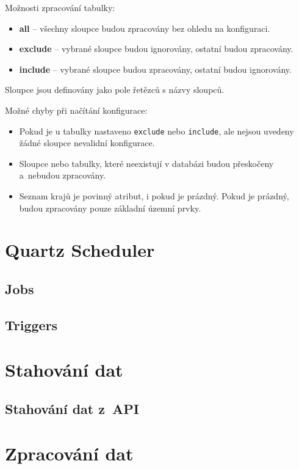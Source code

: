 \begin{enumerate}
    Možnosti zpracování tabulky:
    \begin{itemize}
        \item \textbf{all} -- všechny sloupce budou zpracovány bez ohledu na konfiguraci.
        \item \textbf{exclude} -- vybrané sloupce budou ignorovány, ostatní budou zpracovány.
        \item \textbf{include} -- vybrané sloupce budou zpracovány, ostatní budou ignorovány.
    \end{itemize}

    Sloupce jsou definovány jako pole řetězců s názvy sloupců.
\end{enumerate}

Možné chyby při načítání konfigurace:
\begin{itemize}
    \item Pokud je u tabulky nastaveno \texttt{exclude} nebo \texttt{include}, ale nejsou uvedeny žádné sloupce \textrightarrow{} nevalidní konfigurace.
    \item Sloupce nebo tabulky, které neexistují v databázi \textrightarrow{} budou přeskočeny a~nebudou zpracovány.
    \item Seznam krajů je povinný atribut, i pokud je prázdný. Pokud je prázdný, budou zpracovány pouze základní územní prvky.
\end{itemize}

\newpage

\section{Quartz Scheduler}
\subsection{Jobs}
\subsection{Triggers}

\section{Stahování dat}
\subsection{Stahování dat z~API}

\section{Zpracování dat}
